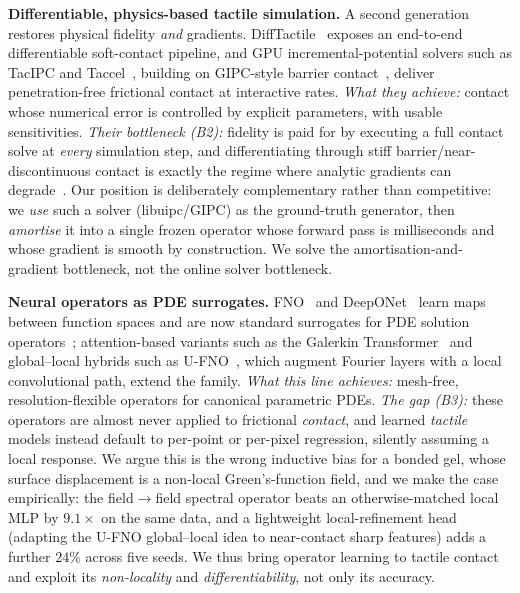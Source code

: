 \documentclass[conference]{IEEEtran}
\begin{document}
\textbf{Differentiable, physics-based tactile simulation.}
A second generation restores physical fidelity \emph{and} gradients.
DiffTactile~\cite{si2024difftactile} exposes an end-to-end differentiable
soft-contact pipeline, and GPU incremental-potential solvers such as TacIPC and
Taccel~\cite{taccel2025}, building on GIPC-style barrier
contact~\cite{huang2024gipc,nguyen2024tacex}, deliver penetration-free frictional
contact at interactive rates. \emph{What they achieve:} contact whose numerical
error is controlled by explicit parameters, with usable sensitivities. \emph{Their bottleneck (B2):} fidelity is paid for by executing a
full contact solve at \emph{every} simulation step, and differentiating through
stiff barrier/near-discontinuous contact is exactly the regime where analytic
gradients can degrade~\cite{suh2022diffsim}. Our position is deliberately
complementary rather than competitive: we \emph{use} such a solver (libuipc/GIPC)
as the ground-truth generator, then \emph{amortise} it into a single frozen
operator whose forward pass is milliseconds and whose gradient is smooth by
construction. We solve the amortisation-and-gradient bottleneck, not the online
solver bottleneck.

\textbf{Neural operators as PDE surrogates.}
FNO~\cite{li2021fno} and DeepONet~\cite{lu2021deeponet} learn maps between function
spaces and are now standard surrogates for PDE solution
operators~\cite{kovachki2023neuraloperator}; attention-based variants such as the
Galerkin Transformer~\cite{cao2021galerkin} and global--local hybrids such as
U-FNO~\cite{wen2022ufno}, which augment Fourier layers with a local convolutional
path, extend the family. \emph{What this line achieves:} mesh-free, resolution-flexible
operators for canonical parametric PDEs. \emph{The gap (B3):} these operators are
almost never applied to frictional \emph{contact}, and learned \emph{tactile}
models instead default to per-point or per-pixel regression, silently assuming a
local response. We argue this is the wrong inductive bias for a bonded gel, whose
surface displacement is a non-local Green's-function field, and we make the case
empirically: the field$\to$field spectral operator beats an otherwise-matched
local MLP by $9.1\times$ on the same data, and a lightweight local-refinement head
(adapting the U-FNO global--local idea to near-contact sharp features) adds a
further $24\%$ across five seeds. We thus bring operator learning to tactile
contact and exploit its \emph{non-locality} and \emph{differentiability}, not only
its accuracy.
\end{document}

